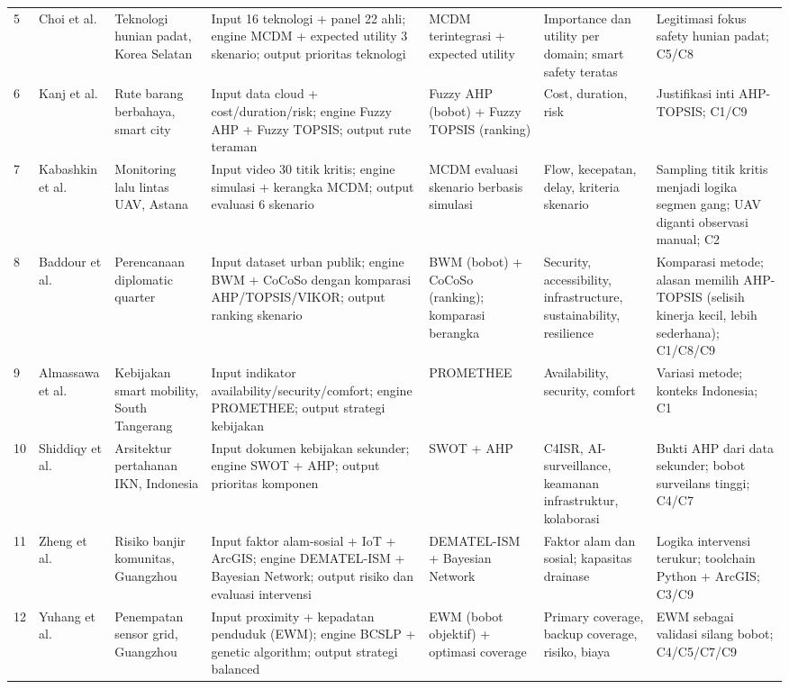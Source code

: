 \documentclass[conference]{IEEEtran}
\begin{document}
\begin{table}[!t]
\begin{tabular}{p{0.5cm}p{1.6cm}p{1.9cm}p{3.6cm}p{2.2cm}p{2.2cm}p{3.4cm}}
5 & Choi et al. \cite{choi2025} & Teknologi hunian padat, Korea Selatan & Input 16 teknologi + panel 22 ahli; engine MCDM + expected utility 3 skenario; output prioritas teknologi & MCDM terintegrasi + expected utility & Importance dan utility per domain; smart safety teratas & Legitimasi fokus safety hunian padat; C5/C8 \\
6 & Kanj et al. \cite{kanj2024} & Rute barang berbahaya, smart city & Input data cloud + cost/duration/risk; engine Fuzzy AHP + Fuzzy TOPSIS; output rute teraman & Fuzzy AHP (bobot) + Fuzzy TOPSIS (ranking) & Cost, duration, risk & Justifikasi inti AHP-TOPSIS; C1/C9 \\
7 & Kabashkin et al. \cite{kabashkin2025} & Monitoring lalu lintas UAV, Astana & Input video 30 titik kritis; engine simulasi + kerangka MCDM; output evaluasi 6 skenario & MCDM evaluasi skenario berbasis simulasi & Flow, kecepatan, delay, kriteria skenario & Sampling titik kritis menjadi logika segmen gang; UAV diganti observasi manual; C2 \\
8 & Baddour et al. \cite{baddour2026} & Perencanaan diplomatic quarter & Input dataset urban publik; engine BWM + CoCoSo dengan komparasi AHP/TOPSIS/VIKOR; output ranking skenario & BWM (bobot) + CoCoSo (ranking); komparasi berangka & Security, accessibility, infrastructure, sustainability, resilience & Komparasi metode; alasan memilih AHP-TOPSIS (selisih kinerja kecil, lebih sederhana); C1/C8/C9 \\
9 & Almassawa et al. \cite{almassawa2024} & Kebijakan smart mobility, South Tangerang & Input indikator availability/security/comfort; engine PROMETHEE; output strategi kebijakan & PROMETHEE & Availability, security, comfort & Variasi metode; konteks Indonesia; C1 \\
10 & Shiddiqy et al. \cite{shiddiqy2025} & Arsitektur pertahanan IKN, Indonesia & Input dokumen kebijakan sekunder; engine SWOT + AHP; output prioritas komponen & SWOT + AHP & C4ISR, AI-surveillance, keamanan infrastruktur, kolaborasi & Bukti AHP dari data sekunder; bobot surveilans tinggi; C4/C7 \\
11 & Zheng et al. \cite{zheng2025} & Risiko banjir komunitas, Guangzhou & Input faktor alam-sosial + IoT + ArcGIS; engine DEMATEL-ISM + Bayesian Network; output risiko dan evaluasi intervensi & DEMATEL-ISM + Bayesian Network & Faktor alam dan sosial; kapasitas drainase & Logika intervensi terukur; toolchain Python + ArcGIS; C3/C9 \\
12 & Yuhang et al. \cite{yuhang2025} & Penempatan sensor grid, Guangzhou & Input proximity + kepadatan penduduk (EWM); engine BCSLP + genetic algorithm; output strategi balanced & EWM (bobot objektif) + optimasi coverage & Primary coverage, backup coverage, risiko, biaya & EWM sebagai validasi silang bobot; C4/C5/C7/C9 \\
\bottomrule
\end{tabular}
\end{table}
\end{document}
